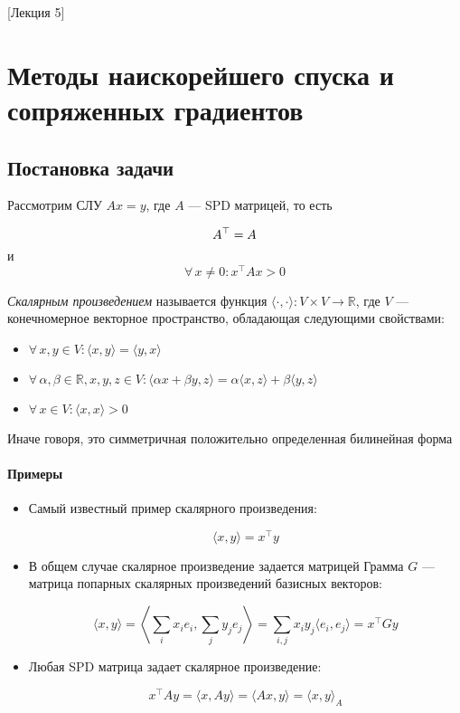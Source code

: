 [Лекция 5]

\newpage

\section{Методы наискорейшего спуска и сопряженных градиентов}

\subsection*{Постановка задачи}

Рассмотрим СЛУ $Ax = y$, где $A$ --- SPD матрицей, то есть

\[
A^{\top} = A\\
\]
и
\[
\forall \, x \neq 0: x^{\top} A x > 0
\]

\begin{definition}
    \textit{Скалярным произведением} называется функция $\langle \cdot, \cdot \rangle: V \times V \longrightarrow \mathbb{R}$, где $V$ --- конечномерное векторное пространство, обладающая следующими свойствами:

    \begin{itemize}
        \item $\forall \, x, y \in V: \langle x, y \rangle = \langle y, x \rangle$

        \item $\forall \, \alpha, \beta \in \mathbb{R}, x, y, z \in V: \langle \alpha x + \beta y, z \rangle = \alpha \langle x, z \rangle + \beta \langle y, z \rangle$

        \item $\forall \, x \in V: \langle x, x \rangle > 0$
    \end{itemize}

    Иначе говоря, это симметричная положительно определенная билинейная форма
\end{definition}

\paragraph{Примеры}

\begin{itemize}
    \item Самый известный пример скалярного произведения:

    \[
    \langle x, y \rangle = x^{\top}y
    \]

    \item В общем случае скалярное произведение задается матрицей Грамма $G$ --- матрица попарных скалярных произведений базисных векторов:

    \[
    \langle x, y \rangle = \left\langle \sum\limits_{i} x_i e_i, \sum\limits_{j} y_j e_j\right\rangle = \sum\limits_{i, j} x_i y_j \langle e_i, e_j \rangle = x^{\top} G y
    \]

    \item Любая SPD матрица задает скалярное произведение:

    \[
    x^{\top} A y = \langle x, A y \rangle = \langle A x, y \rangle = \langle x, y \rangle_A
    \]
\end{itemize}

